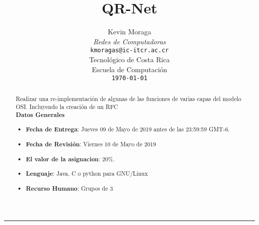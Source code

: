 \documentclass[11pt,a4paper]{scrartcl}			%
\title{QR-Net}
\author{%
	Kevin Moraga \\
	\textit{Redes de Computadoras} \\
	\texttt{kmoragas@ic-itcr.ac.cr}\vspace{40pt} \\
	Tecnológico de Costa Rica \\
	Escuela de Computación \\
	\texttt{\monthyeardate\today}
	}
\makeatletter
\def\printtitle{%
    {\centering \huge \normalfont \textbf{\@title}\par}}		%
\def\printauthor{%
    {\large \@author}}				%
\makeatother
\begin{document}
\begin{minipage}{0.35\linewidth}
	\begin{flushright}
		\printauthor
	\end{flushright}
\end{minipage} \hspace{0pt}
%
\begin{minipage}{0.02\linewidth}
	\rule{3pt}{175pt}
\end{minipage} \hspace{0pt}
%
\begin{minipage}{0.63\linewidth}
\printtitle 
\vspace{5pt}
	\begin{abstract} 
Realizar una re-implementación de algunas de las funciones de varias
capas del modelo OSI. Incluyendo la creación de un RFC \\

\textbf{Datos Generales}
\begin{itemize}
\item \textbf{Fecha de Entrega}:  Jueves 09 de Mayo de 2019 antes de las 23:59:59 GMT-6. 
\item \textbf{Fecha de Revisión}: Viernes 10 de Mayo de 2019
\item \textbf{El valor de la asignacion}: 20\%.
\item \textbf{Lenguaje}: Java, C o python para GNU/Linux
\item \textbf{Recurso Humano}: Grupos de 3
\end{itemize}
	\end{abstract}
\end{minipage}
\vspace{20pt}		%



\spanishsignitems

\setlength{\columnsep}{0.5cm}
\end{document}
